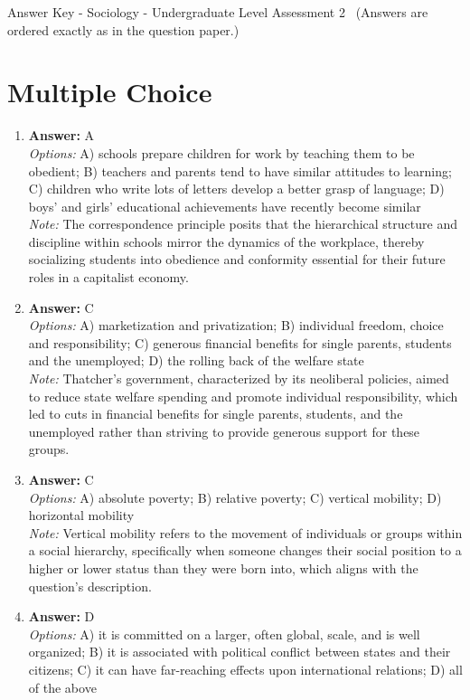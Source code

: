 \documentclass[12pt]{article}
\begin{document}
\begin{center}
Answer Key - Sociology - Undergraduate Level Assessment 2 \
\small (Answers are ordered exactly as in the question paper.)
\end{center}

\section*{Multiple Choice}
\begin{enumerate}[label=\arabic*.]
\item \textbf{Answer:} A
\\ \textit{Options:} A) schools prepare children for work by teaching them to be obedient; B) teachers and parents tend to have similar attitudes to learning; C) children who write lots of letters develop a better grasp of language; D) boys' and girls' educational achievements have recently become similar
\\ \textit{Note:} The correspondence principle posits that the hierarchical structure and discipline within schools mirror the dynamics of the workplace, thereby socializing students into obedience and conformity essential for their future roles in a capitalist economy.
\item \textbf{Answer:} C
\\ \textit{Options:} A) marketization and privatization; B) individual freedom, choice and responsibility; C) generous financial benefits for single parents, students and the unemployed; D) the rolling back of the welfare state
\\ \textit{Note:} Thatcher's government, characterized by its neoliberal policies, aimed to reduce state welfare spending and promote individual responsibility, which led to cuts in financial benefits for single parents, students, and the unemployed rather than striving to provide generous support for these groups.
\item \textbf{Answer:} C
\\ \textit{Options:} A) absolute poverty; B) relative poverty; C) vertical mobility; D) horizontal mobility
\\ \textit{Note:} Vertical mobility refers to the movement of individuals or groups within a social hierarchy, specifically when someone changes their social position to a higher or lower status than they were born into, which aligns with the question's description.
\item \textbf{Answer:} D
\\ \textit{Options:} A) it is committed on a larger, often global, scale, and is well organized; B) it is associated with political conflict between states and their citizens; C) it can have far-reaching effects upon international relations; D) all of the above

\end{enumerate}
\end{document}
